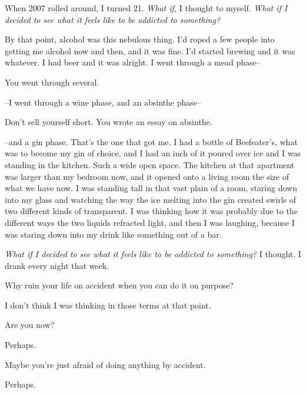 \label{ally:5}
\begin{paracol}{2}
  \begin{leftcolumn}

\noindent When 2007 rolled around, I turned 21. \emph{What if,} I thought to myself. \emph{What if I decided to see what it feels like to be addicted to something?}

By that point, alcohol was this nebulous thing. I'd roped a few people into getting me alcohol now and then, and it was fine. I'd started brewing and it was whatever. I had beer and it was alright. I went through a mead phase--

\begin{ally}
You went through several.
\end{ally}
--I went through a wine phase, and an absinthe phase--

\begin{ally}
Don't sell yourself short. You wrote an essay on absinthe.
\end{ally}
--and a gin phase. That's the one that got me. I had a bottle of Beefeater's, what was to become my gin of choice, and I had an inch of it poured over ice and I was standing in the kitchen. Such a wide open space. The kitchen at that apartment was larger than my bedroom now, and it opened onto a living room the size of what we have now. I was standing tall in that vast plain of a room, staring down into my glass and watching the way the ice melting into the gin created swirls of two different kinds of transparent. I was thinking how it was probably due to the different ways the two liquids refracted light, and then I was laughing, because I was staring down into my drink like something out of a bar.

\emph{What if I decided to see what it feels like to be addicted to something?} I thought. I drank every night that week.

\begin{ally}
Why ruin your life on accident when you can do it on purpose?
\end{ally}
I don't think I was thinking in those terms at that point.

\begin{ally}
Are you now?
\end{ally}
Perhaps.

\begin{ally}
Maybe you're just afraid of doing anything by accident.
\end{ally}
Perhaps.


\end{leftcolumn}
\end{paracol}
